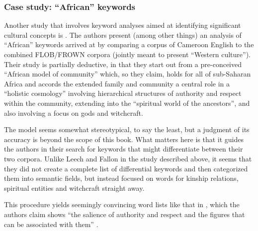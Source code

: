 \subsubsection{Case study: ``African'' keywords}
\label{sec:africankeywords}

Another study that involves keyword  analyses aimed at identifying significant cultural  concepts is \citet{wolf_fixed_2007}. The authors present (among other things) an analysis of ``African''  keywords arrived at by comparing a corpus of Cameroon English to the combined FLOB\slash FROWN corpora (jointly meant to present ``Western culture'').  Their study is partially deductive,  in that they start out from a pre\hyp{}conceived ``African model of community'' which, so they claim, holds for all of sub\hyp{}Saharan Africa and accords the extended family and community a central role in a ``holistic cosmology'' involving hierarchical structures of authority and respect within the community, extending into the ``spiritual world of the ancestors'', and also involving a focus on gods and witchcraft.

The model seems somewhat stereotypical, to say the least, but a judgment of its accuracy is beyond the scope of this book. What matters here is that it guides the authors in their search for keywords  that might differentiate between their two corpora. Unlike Leech and Fallon in the study described above, it seems that they did not create a complete list of differential keywords and then categorized  them into semantic  fields, but instead focused on words for kinship relations, spiritual entities and witchcraft straight away.

This procedure yields seemingly convincing word lists like that in , which the authors claim shows ``the salience of authority and respect and the figures that can be associated  with them'' \citet[420]{wolf_fixed_2007}.


